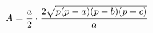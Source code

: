 \documentclass[preview]{standalone}
\begin{document}
\begin{align*}
\special{dvisvgm:raw <g id='unique000'>}A = \frac{a}{2} \cdot \frac{2\sqrt{p(p-a)(p-b)(p-c)}}{a}\special{dvisvgm:raw </g>}
\end{align*}
\end{document}
